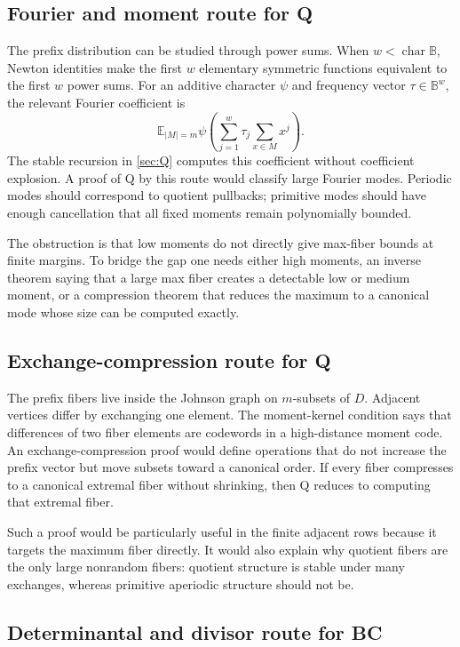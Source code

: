 \documentclass[11pt]{article}
\theoremstyle{definition}
\theoremstyle{remark}
\newcommand{\BB}{\mathbb B}
\newcommand{\E}{\mathbb E}
\begin{document}
\subsection{Fourier and moment route for Q}\label{appsub:fourier-Q}

The prefix distribution can be studied through power sums.  When \(w<\operatorname{char}\BB\), Newton identities make the first \(w\) elementary symmetric functions equivalent to the first \(w\) power sums.  For an additive character \(\psi\) and frequency vector \(\tau\in\BB^w\), the relevant Fourier coefficient is
\[
        \E_{|M|=m}\psi\left(\sum_{j=1}^w \tau_j\sum_{x\in M}x^j\right).
\]
The stable recursion in \cref{sec:Q} computes this coefficient without coefficient explosion.  A proof of Q by this route would classify large Fourier modes.  Periodic modes should correspond to quotient pullbacks; primitive modes should have enough cancellation that all fixed moments remain polynomially bounded.

The obstruction is that low moments do not directly give max-fiber bounds at finite margins.  To bridge the gap one needs either high moments, an inverse theorem saying that a large max fiber creates a detectable low or medium moment, or a compression theorem that reduces the maximum to a canonical mode whose size can be computed exactly.

\subsection{Exchange-compression route for Q}\label{appsub:compression-Q}

The prefix fibers live inside the Johnson graph on \(m\)-subsets of \(D\).  Adjacent vertices differ by exchanging one element.  The moment-kernel condition says that differences of two fiber elements are codewords in a high-distance moment code.  An exchange-compression proof would define operations that do not increase the prefix vector but move subsets toward a canonical order.  If every fiber compresses to a canonical extremal fiber without shrinking, then Q reduces to computing that extremal fiber.

Such a proof would be particularly useful in the finite adjacent rows because it targets the maximum fiber directly.  It would also explain why quotient fibers are the only large nonrandom fibers: quotient structure is stable under many exchanges, whereas primitive aperiodic structure should not be.

\subsection{Determinantal and divisor route for BC}\label{appsub:determinantal-BC}
\end{document}
